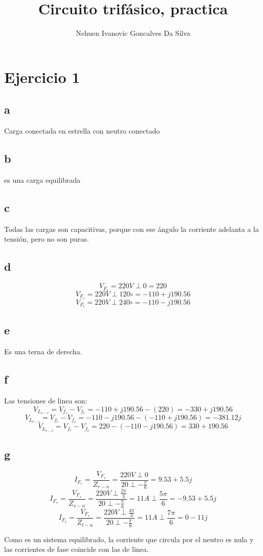 \documentclass{article}
\title{Circuito trifásico, practica}
\author{Nehuen Ivanovic Goncalves Da Silva}
\date{}
\begin{document}
\maketitle
\section{Ejercicio 1}
\subsection{a}
Carga conectada en estrella con neutro conectado
\subsection{b}
 es una carga equilibrada
\subsection{c}
Todas las cargas son capacitivas, porque con ese ángulo la corriente adelanta a la tensión, pero no son puras.
\subsection{d}
\[V_F_r=220V\perp0=220\]
\[V_F_s=220V\perp120\circ=-110+j190.56\]
\[V_F_t=220V\perp240\circ=-110-j190.56\]
\subsection{e}
Es una terna de derecha.
\subsection{f}
Las tensiones de linea son:
\[V_L_{s-r}=V_f_s-V_f_r=-110+j190.56-(220)=-330+j190.56\]
\[V_L_{t-s}=V_f_t-V_f_s=-110-j190.56-(-110+j190.56)=-381.12j\]
\[V_L_{r-t}=V_f_r-V_f_t=220-(-110-j190.56)=330+190.56\]

\subsection{g}
\[I_F_r=\frac{V_F_r}{Z_{r-n}}=\frac{220V\perp0}{20\perp-\frac{\pi}{6}}=9.53+5.5j\]
\[I_F_s=\frac{V_F_s}{Z_{s-n}}=\frac{220V\perp\frac{2\pi}{3}}{20\perp-\frac{\pi}{6}}=11A\perp \frac{5\pi}{6}=-9.53+5.5j\]
\[I_F_t=\frac{V_F_t}{Z_{t-n}}=\frac{220V\perp\frac{4\pi}{3}}{20\perp-\frac{\pi}{6}}=11A\perp \frac{7\pi}{6}=0-11j\]

Como es un sistema equilibrado, la corriente que circula por el neutro es nula y las corrientes de fase coincide con las de linea.
\end{document}
